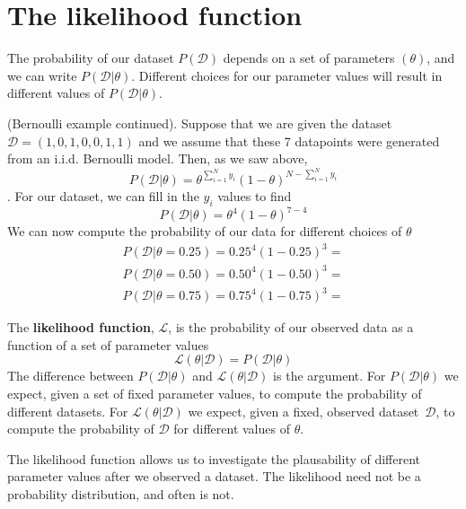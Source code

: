 \section{ The likelihood function }

The probability of our dataset $P(\mathcal{D} )$ depends on a set of parameters $(\theta)$, and we can write $P(\mathcal{D} | \theta)$.
Different choices for our parameter values will result in different values of $P(\mathcal{D} | \theta)$. 

\ex (Bernoulli example continued). Suppose that we are given the dataset $\mathcal{D} = (1,0,1,0,0,1,1)$ and we assume that these 7 datapoints were generated from an i.i.d. Bernoulli model. Then, as we saw above, 
\begin{equation}
    P(\mathcal{D} | \theta) = \theta^{ \sum_{i=1}^{N} y_{i}  } (1-\theta)^{N - \sum_{i=1}^{N} y_{i} }    
\end{equation}. 
For our dataset, we can fill in the $y_{i}$ values to find  
\begin{equation}
    P(\mathcal{D} | \theta) = \theta^{ 4 } (1-\theta)^{7 - 4 }    
\end{equation}
We can now compute the probability of our data for different choices of $\theta$
\begin{align}
    P(\mathcal{D} | \theta=0.25) = 0.25^{ 4 } (1-0.25)^{3 } = \\
    P(\mathcal{D} | \theta=0.50) = 0.50^{ 4 } (1-0.50)^{3 } = \\
    P(\mathcal{D} | \theta=0.75) = 0.75^{ 4 } (1-0.75)^{3 } = 
\end{align}

The \textbf{likelihood function}, $\mathcal{L}$, is the probability of our observed data as a function of a set of parameter values
\begin{equation}
    \mathcal{L}(\theta | \mathcal{D}) = P(\mathcal{D} | \theta)
\end{equation}
The difference between $P(\mathcal{D} | \theta)$ and $\mathcal{L}(\theta | \mathcal{D})$ is the argument.
For $P(\mathcal{D} | \theta)$ we expect, given a set of fixed parameter values, to compute the probability of different datasets. 
For $\mathcal{L}(\theta | \mathcal{D})$ we expect, given a fixed, observed dataset~$\mathcal{D}$, to compute the probability of $\mathcal{D}$ for different values of $\theta$.

The likelihood function allows us to investigate the plausability of different parameter values after we observed a dataset. 
The likelihood need not be a probability distribution, and often is not. 

